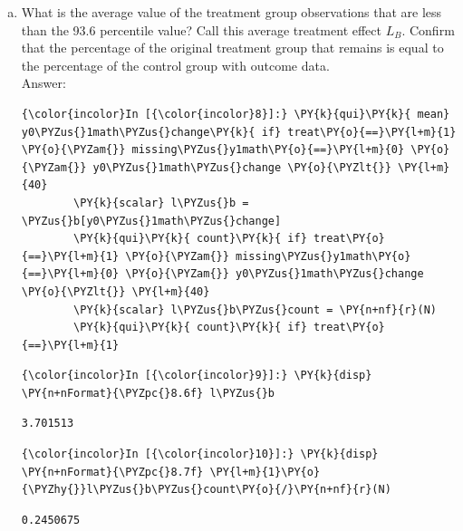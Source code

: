 \documentclass[11pt,notitlepage]{article}\usepackage[]{graphicx}\usepackage[]{color}
\makeatletter
\newenvironment{kframe}{%
 \def\at@end@of@kframe{}%
 \ifinner\ifhmode%
  \def\at@end@of@kframe{\end{minipage}}%
  \begin{minipage}{\columnwidth}%
 \fi\fi%
 \def\FrameCommand##1{\hskip\@totalleftmargin \hskip-\fboxsep
 \colorbox{shadecolor}{##1}\hskip-\fboxsep
     \hskip-\linewidth \hskip-\@totalleftmargin \hskip\columnwidth}%
 \MakeFramed {\advance\hsize-\width
   \@totalleftmargin\z@ \linewidth\hsize
   \@setminipage}}%
 {\par\unskip\endMakeFramed%
 \at@end@of@kframe}
\newenvironment{knitrout}{}{} %
\makeatother
\begin{document}
\begin{enumerate}[a)]
\item What is the average value of the treatment group observations that are less than the 93.6 percentile value? Call this average treatment effect $L_B$. Confirm that the percentage of the original treatment group that remains is equal to the percentage of the control group with outcome data.\\
Answer:\\
\begin{knitrout}
\color{fgcolor}\begin{kframe}
    \begin{Verbatim}[commandchars=\\\{\}]
{\color{incolor}In [{\color{incolor}8}]:} \PY{k}{qui}\PY{k}{ mean} y0\PYZus{}1math\PYZus{}change\PY{k}{ if} treat\PY{o}{==}\PY{l+m}{1} \PY{o}{\PYZam{}} missing\PYZus{}y1math\PY{o}{==}\PY{l+m}{0} \PY{o}{\PYZam{}} y0\PYZus{}1math\PYZus{}change \PY{o}{\PYZlt{}} \PY{l+m}{40}
        \PY{k}{scalar} l\PYZus{}b = \PYZus{}b[y0\PYZus{}1math\PYZus{}change]
        \PY{k}{qui}\PY{k}{ count}\PY{k}{ if} treat\PY{o}{==}\PY{l+m}{1} \PY{o}{\PYZam{}} missing\PYZus{}y1math\PY{o}{==}\PY{l+m}{0} \PY{o}{\PYZam{}} y0\PYZus{}1math\PYZus{}change \PY{o}{\PYZlt{}} \PY{l+m}{40}
        \PY{k}{scalar} l\PYZus{}b\PYZus{}count = \PY{n+nf}{r}(N)
        \PY{k}{qui}\PY{k}{ count}\PY{k}{ if} treat\PY{o}{==}\PY{l+m}{1}
\end{Verbatim}

    \begin{Verbatim}[commandchars=\\\{\}]
{\color{incolor}In [{\color{incolor}9}]:} \PY{k}{disp} \PY{n+nFormat}{\PYZpc{}8.6f} l\PYZus{}b
\end{Verbatim}

    \begin{Verbatim}[commandchars=\\\{\}]
3.701513

    \end{Verbatim}

    \begin{Verbatim}[commandchars=\\\{\}]
{\color{incolor}In [{\color{incolor}10}]:} \PY{k}{disp} \PY{n+nFormat}{\PYZpc{}8.7f} \PY{l+m}{1}\PY{o}{\PYZhy{}}l\PYZus{}b\PYZus{}count\PY{o}{/}\PY{n+nf}{r}(N)
\end{Verbatim}

    \begin{Verbatim}[commandchars=\\\{\}]
0.2450675


\end{Verbatim}
\end{kframe}
\end{knitrout}
\end{enumerate}
\end{document}
